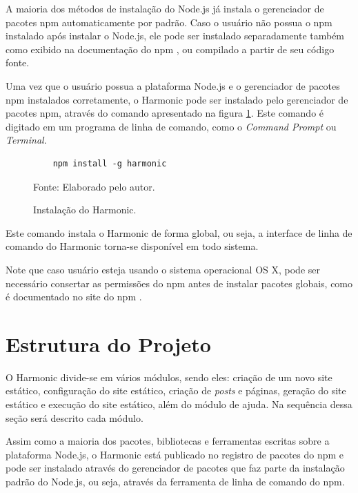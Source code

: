 \documentclass[ppginf, pep]{esinucpel}
\begin{document}
A maioria dos métodos de instalação do Node.js já instala o gerenciador de pacotes npm automaticamente por padrão. Caso o usuário não possua o npm instalado após instalar o Node.js, ele pode ser instalado separadamente também como exibido na documentação do npm \cite{npm_fancy_install}, ou compilado a partir de seu código fonte.

Uma vez que o usuário possua a plataforma Node.js e o gerenciador de pacotes npm instalados corretamente, o Harmonic pode ser instalado pelo gerenciador de pacotes npm, através do comando apresentado na figura \ref{fig:install_harmonic}. Este comando é digitado em um programa de linha de comando, como o \textit{Command Prompt} ou \textit{Terminal}.

\begin{figure}[H]
    \centering
    \caption{Instalação do Harmonic.}
    \vspace{5pt}
    \lstset{language=sh}
    \begin{lstlisting}
    npm install -g harmonic
    \end{lstlisting}
    Fonte: Elaborado pelo autor.
    \label{fig:install_harmonic}
\end{figure}

Este comando instala o Harmonic de forma global, ou seja, a interface de linha de comando do Harmonic torna-se disponível em todo sistema.

Note que caso usuário esteja usando o sistema operacional OS X, pode ser necessário consertar as permissões do npm antes de instalar pacotes globais, como é documentado no site do npm \cite{npm_fix_perms}.

\section{Estrutura do Projeto}

O Harmonic divide-se em vários módulos, sendo eles: criação de um novo site estático, configuração do site estático, criação de \textit{posts} e páginas, geração do site estático e execução do site estático, além do módulo de ajuda. Na sequência dessa seção será descrito cada módulo.

Assim como a maioria dos pacotes, bibliotecas e ferramentas escritas sobre a plataforma Node.js, o Harmonic está publicado no registro de pacotes do npm e pode ser instalado através do gerenciador de pacotes que faz parte da instalação padrão do Node.js, ou seja, através da ferramenta de linha de comando do npm.
\end{document}
